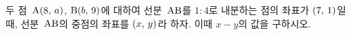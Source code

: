 두 점~$\mathrm{A}(8,\mkern3mu a)$, $\mathrm{B}(b,\mkern3mu 9)$에 대하여 선분~$\mathrm{AB}$를 $1:4$로 내분하는 점의 좌표가 $(7,\mkern3mu 1)$일 때, 선분~$\mathrm{AB}$의 중점의 좌표를 $(x,\mkern3mu y)$라 하자. 이때 $x-y$의 값을 구하시오.
